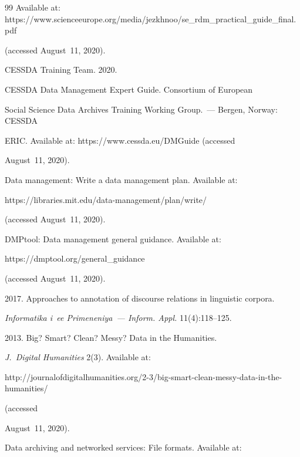 {{\begin{thebibliography}{99}
Available at: {\sf https://www.scienceeurope.org/\linebreak media/jezkhnoo/se\_rdm\_practical\_guide\_final.pdf} 

(accessed August~11, 2020).




CESSDA Training Team. 2020.

CESSDA Data Management Expert Guide. Consortium of European 

Social Science Data Archives  Training Working Group.~--- Bergen, Norway: CESSDA 

ERIC. Available at:  {\sf https://www.cessda.eu/DMGuide} (accessed 

August~11, 2020).




Data management: Write a data management plan. Available at: {\sf  

https://\linebreak libraries.mit.edu/data-management/plan/write/} (accessed August~11, 2020).


DMPtool: Data management general guidance. Available at: {\sf  

https://dmptool.org/\linebreak general\_guidance} (accessed August~11, 2020).




 2017. Approaches to annotation of discourse relations in linguistic corpora. 

\textit{Informatika i~ee Primeneniya~--- Inform. Appl.} 11(4):118--125.




 2013. Big? Smart? Clean? Messy? Data in the Humanities. 

\textit{J.~Digital Humanities} 2(3). Available at: {\sf  

http://journalofdigitalhumanities.org/2-3/big-smart-clean-messy-data-in-the-humanities/} (accessed 

August~11, 2020).


Data archiving and networked services: File formats. Available at: {\sf 

}
\end{thebibliography}}}
